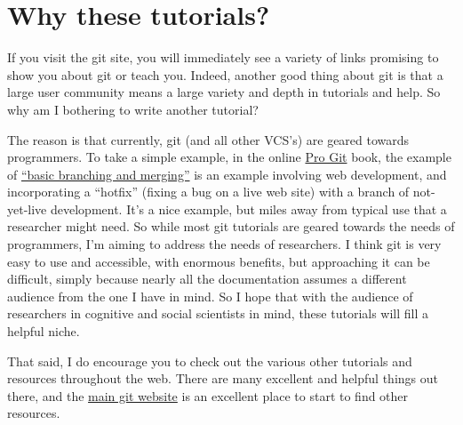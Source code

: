 \documentclass[11pt]{article}
\begin{document}
\begin{enumerate}
\end{enumerate}
\section{Why these tutorials?}
\label{sec-5}

If you visit the git site, you will immediately see a variety of links promising to show you about git or teach you. Indeed, another good thing about git is that a large user community means a large variety and depth in tutorials and help. So why am I bothering to write another tutorial?

The reason is that currently, git (and all other VCS's) are geared towards programmers. To take a simple example, in the online \href{http://git-scm.com/doc}{Pro Git} book, the example of \href{http://git-scm.com/book/en/Git-Branching-Basic-Branching-and-Merging}{``basic branching and merging''} is an example involving web development, and incorporating a ``hotfix'' (fixing a bug on a live web site) with a branch of not-yet-live development. It's a nice example, but miles away from typical use that a researcher might need. So while most git tutorials are geared towards the needs of programmers, I'm aiming to address the needs of researchers.  I think git is very easy to use and accessible, with enormous benefits, but approaching it can be difficult, simply because nearly all the documentation assumes a different audience from the one I have in mind.  So I hope that with the audience of researchers in cognitive and social scientists in mind, these tutorials will fill a helpful niche.

That said, I do encourage you to check out the various other tutorials and resources throughout the web.  There are many excellent and helpful things out there, and the \href{http://git-scm.com/}{main git website} is an excellent place to start to find other resources.
\end{document}
